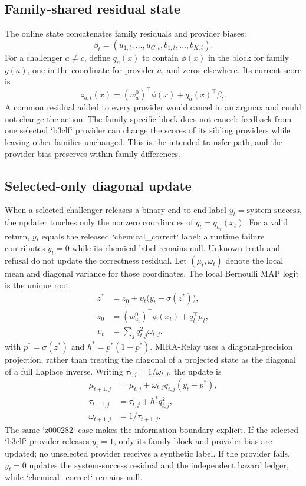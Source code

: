 \documentclass[sigconf,anonymous]{aamas}
\begin{document}
\subsection{Family-shared residual state}
The online state concatenates family residuals and provider biases:
$$
\beta_t=(u_{1,t},\ldots,u_{G,t},b_{1,t},\ldots,b_{K,t}).
$$
For a challenger $a\neq c$, define $q_a(x)$ to contain $\phi(x)$ in the block for family $g(a)$, one in the coordinate for provider $a$, and zeros elsewhere. Its current score is
$$
z_{a,t}(x)=(w_a^0)^\top\phi(x)+q_a(x)^\top\beta_t.
$$
A common residual added to every provider would cancel in an argmax and could not change the action. The family-specific block does not cancel: feedback from one selected `b3clf` provider can change the scores of its sibling providers while leaving other families unchanged. This is the intended transfer path, and the provider bias preserves within-family differences.

\subsection{Selected-only diagonal update}
When a selected challenger releases a binary end-to-end label $y_t=\mathrm{system\_success}$, the updater touches only the nonzero coordinates of $q_t=q_{a_t}(x_t)$. For a valid return, $y_t$ equals the released `chemical\_correct` label; a runtime failure contributes $y_t=0$ while its chemical label remains null. Unknown truth and refusal do not update the correctness residual. Let $(\mu_t,\omega_t)$ denote the local mean and diagonal variance for those coordinates. The local Bernoulli MAP logit is the unique root
$$
\begin{aligned}
z^*&=z_0+\upsilon_t\bigl(y_t-\sigma(z^*)\bigr),\\
z_0&=(w_{a_t}^0)^\top\phi(x_t)+q_t^\top\mu_t,\\
\upsilon_t&=\sum_j q_{t,j}^2\omega_{t,j}.
\end{aligned}
$$
with $p^*=\sigma(z^*)$ and $h^*=p^*(1-p^*)$. MIRA-Relay uses a diagonal-precision projection, rather than treating the diagonal of a projected state as the diagonal of a full Laplace inverse. Writing $\tau_{t,j}=1/\omega_{t,j}$, the update is
$$
\begin{aligned}
\mu_{t+1,j}&=\mu_{t,j}+\omega_{t,j}q_{t,j}(y_t-p^*),\\
\tau_{t+1,j}&=\tau_{t,j}+h^*q_{t,j}^2,\\
\omega_{t+1,j}&=1/\tau_{t+1,j}.
\end{aligned}
$$
The same `z000282` case makes the information boundary explicit. If the selected `b3clf` provider releases $y_t=1$, only its family block and provider bias are updated; no unselected provider receives a synthetic label. If the provider fails, $y_t=0$ updates the system-success residual and the independent hazard ledger, while `chemical\_correct` remains null.
\end{document}
